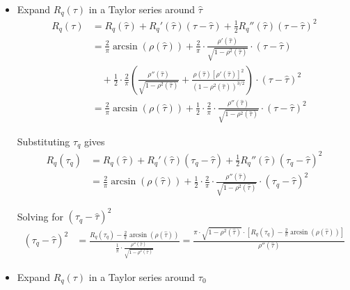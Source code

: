 \documentclass{article}
\begin{document}
	\begin{itemize}
		\item Expand $R_q(\tau)$ in a Taylor series around $\hat{\tau}$
		\begin{equation}
			\begin{aligned}
				R_q(\tau) &= R_q(\hat{\tau}) + R_q'(\hat{\tau})(\tau - \hat{\tau}) + \frac{1}{2} R_q''(\hat{\tau})(\tau - \hat{\tau})^2  \\
				&= \frac{2}{\pi} \arcsin(\rho(\hat{\tau})) + \frac{2}{\pi} \cdot \frac{\rho'(\hat{\tau})}{\sqrt{1 - \rho^2(\hat{\tau})}} \cdot (\tau - \hat{\tau})  \\
				&\quad + \frac{1}{2} \cdot \frac{2}{\pi} \left( \frac{\rho''(\hat{\tau})}{\sqrt{1 - \rho^2(\hat{\tau})}} + \frac{\rho(\hat{\tau})[\rho'(\hat{\tau})]^2}{(1 - \rho^2(\hat{\tau}))^{3/2}} \right) \cdot (\tau - \hat{\tau})^2  \\
				&= \frac{2}{\pi} \arcsin(\rho(\hat{\tau})) + \frac{1}{2} \cdot \frac{2}{\pi} \cdot \frac{\rho''(\hat{\tau})}{\sqrt{1 - \rho^2(\hat{\tau})}} \cdot (\tau - \hat{\tau})^2 
			\end{aligned}
		\end{equation}
		
		Substituting $\tau_q$ gives
		\begin{equation}
			\begin{aligned}
				R_q(\tau_q) &= R_q(\hat{\tau}) + R_q'(\hat{\tau})(\tau_q - \hat{\tau}) + \frac{1}{2} R_q''(\hat{\tau})(\tau_q - \hat{\tau})^2  \\
				&= \frac{2}{\pi} \arcsin(\rho(\hat{\tau})) + \frac{1}{2} \cdot \frac{2}{\pi} \cdot \frac{\rho''(\hat{\tau})}{\sqrt{1 - \rho^2(\hat{\tau})}} \cdot (\tau_q - \hat{\tau})^2 
			\end{aligned}
		\end{equation}
		
		Solving for $(\tau_q - \hat{\tau})^2$
		\begin{equation}
			\begin{aligned}
				(\tau_q - \hat{\tau})^2 &= \frac{R_q(\tau_q) - \frac{2}{\pi} \arcsin(\rho(\hat{\tau}))}{\frac{1}{\pi} \cdot \frac{\rho''(\hat{\tau})}{\sqrt{1 - \rho^2(\hat{\tau})}}} = \frac{\pi \cdot \sqrt{1 - \rho^2(\hat{\tau})} \cdot \left[ R_q(\tau_q) - \frac{2}{\pi} \arcsin(\rho(\hat{\tau})) \right]}{\rho''(\hat{\tau})} 
			\end{aligned}
		\end{equation}
		
		\item Expand $R_q(\tau)$ in a Taylor series around $\tau_0$
		

\end{itemize}
\end{document}
